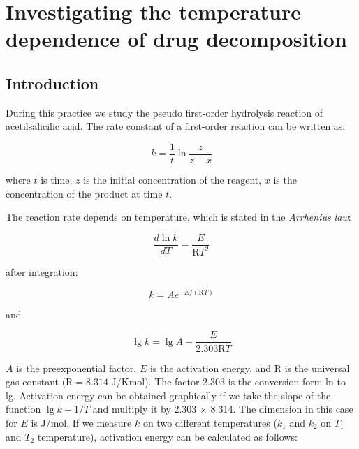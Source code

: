 \section{Investigating the temperature dependence of drug decomposition}
\subsection{Introduction}

During this practice we study the pseudo first-order hydrolysis reaction of acetilsalicilic acid.
The rate constant of a first-order reaction can be written as:

\begin{equation}
\label{eq:divider}
        k
        =
        \frac
                {1}
                {t}
	\ln
	\frac{z}{z-x}
\end{equation}

where $t$ is time, $z$ is the initial concentration of the reagent, $x$ is the concentration of the product at time $t$.

The reaction rate depends on temperature, which is stated in the \emph{Arrhenius law}:

\begin{equation}
\label{eq:divider}
        \frac
                {d\ln k}
                {dT}
	=
	\frac
		{E}
		{\mathrm{R}T^2}
\end{equation}

after integration:

\begin{equation}
\label{eq:divider}
        k
        =
	A
	e^{-E/( \mathrm{R} T)}
\end{equation}

and

\begin{equation}
\label{eq:divider}
        \lg k
        =
        \lg A
	-\frac{E}{2.303 \mathrm{R}T}
\end{equation}

$A$ is the preexponential factor, $E$ is the activation energy, and R is the universal gas constant (R$ = 8.314$ J/Kmol). The factor 2.303 is the conversion form ln to lg.
Activation energy can be obtained graphically if we take the slope of the function $\lg k - 1/T$ and multiply it by 2.303 $\times$ 8.314. The dimension in this case for $E$ is J/mol.
If we measure $k$ on two different temperatures ($k_1$ and $k_2$ on $T_1$ and $T_2$ temperature), activation energy can be calculated as follows:

